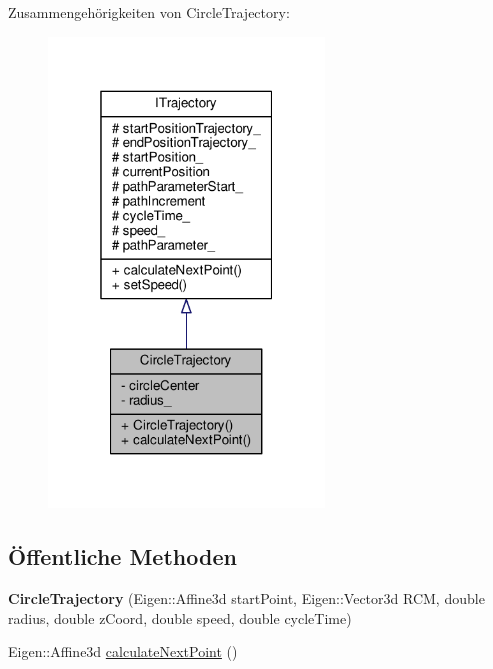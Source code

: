 Zusammengehörigkeiten von Circle\-Trajectory\-:
\nopagebreak
\begin{figure}[H]
\begin{center}
\leavevmode
\includegraphics[width=208pt]{classCircleTrajectory__coll__graph}
\end{center}
\end{figure}
\subsection*{Öffentliche Methoden}
\begin{DoxyCompactItemize}
\item 
\hypertarget{classCircleTrajectory_a4d8e3dad20e722dd795ddba29eaea785}{{\bfseries Circle\-Trajectory} (Eigen\-::\-Affine3d start\-Point, Eigen\-::\-Vector3d R\-C\-M, double radius, double z\-Coord, double speed, double cycle\-Time)}\label{classCircleTrajectory_a4d8e3dad20e722dd795ddba29eaea785}

\item 
Eigen\-::\-Affine3d \hyperlink{classCircleTrajectory_a5629eff71ee01458eb8cdf7ad2b4b82f}{calculate\-Next\-Point} ()
\end{DoxyCompactItemize}
